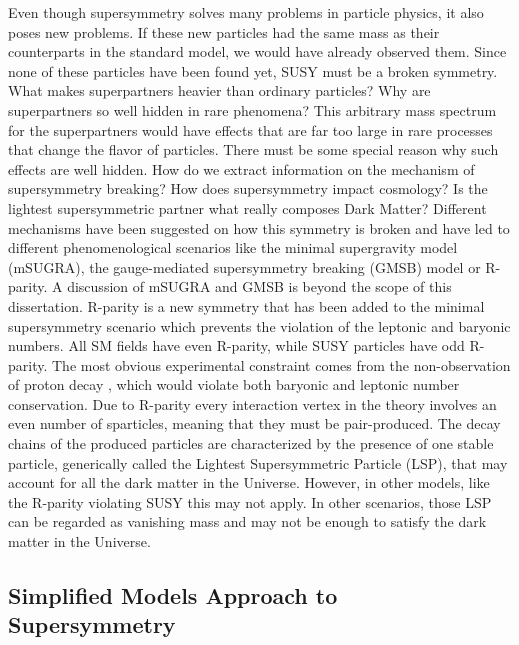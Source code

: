 Even though supersymmetry solves many problems in particle physics, it also poses new problems. If these new particles had the same mass as their counterparts in the standard model, we would have already observed them. Since none of these particles have been found yet, SUSY must be a broken symmetry. What makes superpartners heavier than ordinary particles? Why are superpartners so well hidden in rare phenomena? This arbitrary mass spectrum for the superpartners would have effects that are far too large in rare processes that change the flavor of particles. There must be some special reason why such effects are well hidden. How do we extract information on the mechanism of supersymmetry breaking? How does supersymmetry impact cosmology? Is the lightest supersymmetric partner what really composes Dark Matter? Different mechanisms have been suggested on how this symmetry is broken and have led to different phenomenological scenarios like the minimal supergravity model (mSUGRA)\cite{mSugra1,mSugra2}, the gauge-mediated supersymmetry breaking (GMSB)\cite{GMSB1,GMSB2,GMSB3} model or R-parity\cite{Rparity1,Rparity2}. A discussion of mSUGRA and GMSB is beyond the scope of this dissertation. R-parity is a new symmetry that has been added to the minimal supersymmetry scenario which prevents the violation of the leptonic and baryonic numbers. All SM fields have even R-parity, while SUSY particles have odd R-parity. The most obvious experimental constraint comes from the non-observation of proton decay \cite{pDecay1}, which would violate both baryonic and leptonic number conservation. Due to R-parity every interaction vertex in the theory involves an even number of sparticles, meaning that they must be pair-produced. The decay chains of the produced particles are characterized by the presence of one stable particle, generically called the Lightest Supersymmetric Particle (LSP), that may account for all the dark matter in the Universe. However, in other models, like the R-parity violating SUSY this may not apply. In other scenarios, those LSP can be regarded as vanishing mass and may not be enough to satisfy the dark matter in the Universe.

\subsection{Simplified Models Approach to Supersymmetry}

